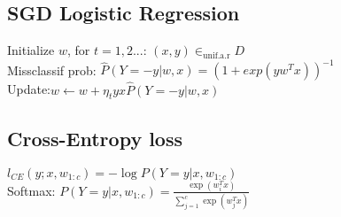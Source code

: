 \subsection*{SGD Logistic Regression}
Initialize $w$, for $t=1,2...$: $(x,y)\in_{\text{unif.a.r}} D$\\
Missclassif prob: $\hat{P}(Y=-y|w,x)=(1+exp(yw^Tx))^{-1}$\\
Update:$w \leftarrow w + \eta_t y x\hat{P}(Y=-y|w,x) $

\subsection*{Cross-Entropy loss}
$l_{CE}(y;x,w_{1:c})=-\log P(Y=y|x,w_{1:c})$\\
Softmax: $P(Y=y|x,w_{1:c})=\frac{\exp(w_i^Tx)}{\sum_{j=1}^c \exp(w_j^Tx)}$